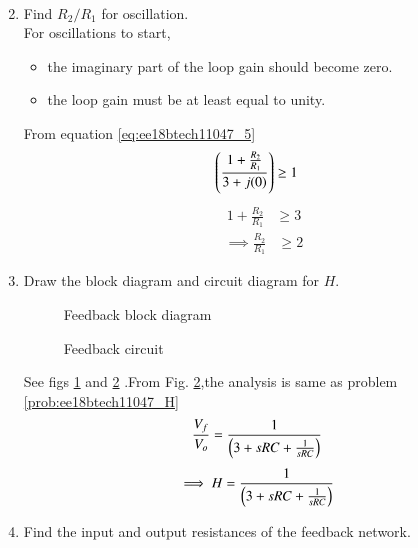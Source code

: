 \begin{enumerate}[label=\arabic*.,ref=\theenumi]
\begin{align}
\end{align}
%
\item Find $R_{2}/R_{1}$ for oscillation.\\
\solution For oscillations to start, 
\begin{itemize}
    \item the imaginary part of the loop gain should become zero.
    \item the loop gain must be at least equal to unity.
\end{itemize}
From equation \eqref{eq:ee18btech11047_5} 
\begin{align}
\left(\frac{1+\frac{R_{2}}{R_{1}}}{3+j(0)}\right) &\geq 1
\end{align}
\begin{align}
1+\frac{R_{2}}{R_{1}} &\geq 3
\end{align}
\begin{align}
\implies \frac{R_{2}}{R_{1}} &\geq 2
\end{align}
\item Draw the block diagram and circuit diagram for $H$.\\
\renewcommand{\thefigure}{\theenumi.\arabic{figure}}
\begin{figure}[!ht]
	\begin{center}
		\resizebox{\columnwidth}{!}{}
	\end{center}
\caption{Feedback block diagram}
\label{fig:ee18btech11047_fig4}
\end{figure}
\begin{figure}[!ht]
	\begin{center}
		\resizebox{\columnwidth}{!}{}
	\end{center}
\caption{Feedback circuit}
\label{fig:ee18btech11047_fig5}
\end{figure}
\renewcommand{\thefigure}{\theenumi}
\solution See figs \ref{fig:ee18btech11047_fig4} and \ref{fig:ee18btech11047_fig5} .From Fig. \ref{fig:ee18btech11047_fig5},the analysis is same as problem \ref{prob:ee18btech11047_H}
\begin{align}
\frac{V_{f}}{V_{o}} &= \frac{1}{\left(3+sRC +\frac{1}{sRC}\right)}
\end{align}
\begin{align}
\implies H &= \frac{1}{\left(3+sRC +\frac{1}{sRC}\right)}
\end{align}
%
\item Find the input and output resistances of the feedback network.\\

\end{enumerate}
